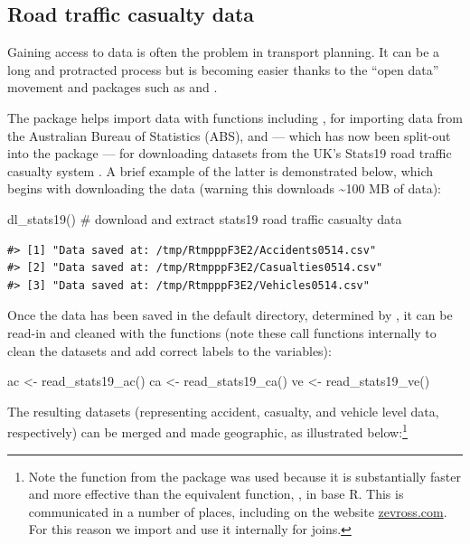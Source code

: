 \subsection{Road traffic casualty data}\label{accessing-and-processing-transport-data}

Gaining access to data is often the problem in transport planning.
It can be a long and protracted process but is becoming
easier thanks to the ``open data'' movement and packages such as
 and 
\citep{walker_tigris:_2016}.

The  package helps import data with functions including
, for importing data from the
Australian Bureau of Statistics (ABS), and
 --- which has now been split-out into the package  --- for downloading datasets from the UK's Stats19 road traffic
casualty system \citep{lovelace_stats19_2019}.
A brief example of the latter is demonstrated below,
which begins with downloading the data (warning this downloads
\textasciitilde{}100 MB of data):

\begin{Schunk}
\begin{Sinput}
dl_stats19() # download and extract stats19 road traffic casualty data
\end{Sinput}
\end{Schunk}

\begin{verbatim}
#> [1] "Data saved at: /tmp/RtmpppF3E2/Accidents0514.csv"
#> [2] "Data saved at: /tmp/RtmpppF3E2/Casualties0514.csv"
#> [3] "Data saved at: /tmp/RtmpppF3E2/Vehicles0514.csv"
\end{verbatim}

Once the data has been saved in the default directory, determined by
, it can be read-in and cleaned with the
 functions (note these call
 functions internally to clean the datasets
and add correct labels to the variables):

\begin{Schunk}
\begin{Sinput}
ac <- read_stats19_ac()
ca <- read_stats19_ca()
ve <- read_stats19_ve()
\end{Sinput}
\end{Schunk}

The resulting datasets (representing accident, casualty, and vehicle
level data, respectively) can be merged and made geographic, as
illustrated below:\footnote{
Note the  function from the  package was used because it is substantially faster and more effective than the equivalent function, , in base R.
This is communicated in a number of places, including on the website \href{http://zevross.com/blog/2014/04/30/mini-post-for-large-tables-in-r-dplyrs-function-inner_join-is-much-faster-than-merge/}{zevross.com}. For this reason we import  and use it internally for joins.}


